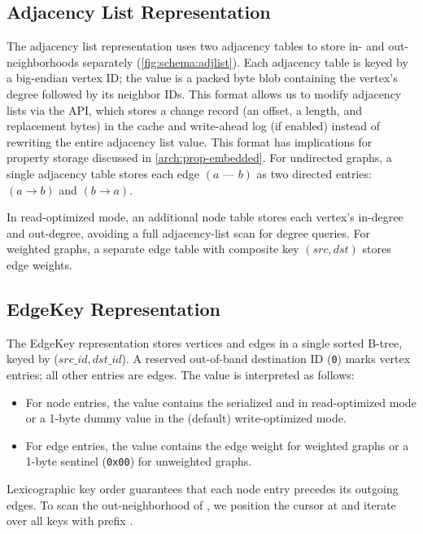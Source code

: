 \subsection{Adjacency List Representation}
\label{arch:adjlist}
The adjacency list representation uses two adjacency tables to store in- and out-neighborhoods separately (\autoref{fig:schema:adjlist}).
Each adjacency table is keyed by a big-endian vertex ID; the value is a packed byte blob containing the vertex's degree followed by its neighbor IDs.
This format allows us to modify adjacency lists via the  API, which stores a change record (an offset, a length, and replacement bytes) in the \wt{} cache and write-ahead log (if enabled) instead of rewriting the entire adjacency list value.
This format has implications for property storage discussed in \autoref{arch:prop-embedded}.
For undirected graphs, a single adjacency table stores each edge $(a\text{ --- }b)$ as two directed entries: $(a \rightarrow b)$ and $(b \rightarrow a)$. 

In read-optimized mode, an additional node table stores each vertex's in-degree and out-degree, avoiding a full adjacency-list scan for degree queries. 
For weighted graphs, a separate edge table with composite key $(src, dst)$ stores edge weights.



\subsection{EdgeKey Representation}
\label{arch:edgekey}
The EdgeKey representation stores vertices and edges in a single sorted B-tree, keyed by ($src\_id, dst\_id$).
A reserved out-of-band destination ID (\texttt{0}) marks vertex entries; all other entries are edges.
The value is interpreted as follows:
\begin{itemize}
  \item For node entries, the value contains the serialized  and  in read-optimized mode or a 1-byte dummy value in the (default) write-optimized mode.
  \item For edge entries, the value contains the edge weight for weighted graphs or a 1-byte sentinel (\texttt{0x00}) for unweighted graphs.
\end{itemize}
Lexicographic key order guarantees that each node entry precedes its outgoing edges.
To scan the out-neighborhood of , we position the cursor at  and iterate over all keys with prefix .

